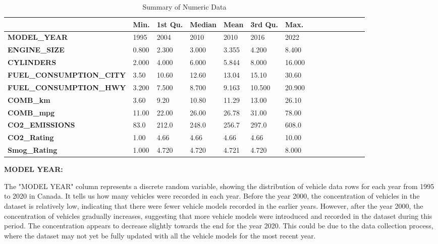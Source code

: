\documentclass[12pt, a4paper,oneside]{book}
\numberwithin{equation}{section}
\begin{document}
\begin{table}
\centering
\caption{Summary of Numeric Data}
\label{tab:numeric_summary}
\begin{tabular}{|p{5.5cm}|p{1cm}|p{1cm}|p{1.3cm}|p{1cm}|p{1cm}|p{1cm}|p{1cm}|p{1cm}|p{1cm}|p{1cm}|p{1cm}|p{1cm}|p{1cm}|p{1cm}|}
\hline
& \textbf{\small Min.} & \textbf{\small 1st Qu.} & \textbf{\small Median} & \textbf{\small Mean} & \textbf{\small 3rd Qu.} & \textbf{\small Max.} \\
\hline
\textbf{\small MODEL\_YEAR} & 1995 & 2004 & 2010 & 2010 & 2016 & 2022 \\
\hline
\textbf{\small ENGINE\_SIZE} & 0.800 & 2.300 & 3.000 & 3.355 & 4.200 & 8.400 \\
\hline
\textbf{\small CYLINDERS} & 2.000 & 4.000 & 6.000 & 5.844 & 8.000 & 16.000 \\
\hline
\textbf{\small FUEL\_CONSUMPTION\_CITY} & 3.50 & 10.60 & 12.60 & 13.04 & 15.10 & 30.60 \\
\hline
\textbf{\small FUEL\_CONSUMPTION\_HWY} & 3.200 & 7.500 & 8.700 & 9.163 & 10.500 & 20.900 \\
\hline
\textbf{\small COMB\_km} & 3.60 & 9.20 & 10.80 & 11.29 & 13.00 & 26.10 \\
\hline
\textbf{\small COMB\_mpg} & 11.00 & 22.00 & 26.00 & 26.78 & 31.00 & 78.00 \\
\hline
\textbf{\small CO2\_EMISSIONS} & 83.0 & 212.0 & 248.0 & 256.7 & 297.0 & 608.0 \\
\hline
\textbf{\small CO2\_Rating} & 1.00 & 4.66 & 4.66 & 4.66 & 4.66 & 10.00 \\
\hline
\textbf{\small Smog\_Rating} & 1.000 & 4.720 & 4.720 & 4.721 & 4.720 & 8.000 \\
\hline
\end{tabular}
\end{table}

\textbf{MODEL YEAR:}

The "MODEL YEAR" column represents a discrete random variable, showing the distribution of vehicle data rows for each year from 1995 to 2020 in Canada. It tells us how many vehicles were recorded in each year. Before the year 2000, the concentration of vehicles in the dataset is relatively low, indicating that there were fewer vehicle models recorded in the earlier years. However, after the year 2000, the concentration of vehicles gradually increases, suggesting that more vehicle models were introduced and recorded in the dataset during this period. The concentration appears to decrease slightly towards the end for the year 2020. This could be due to the data collection process, where the dataset may not yet be fully updated with all the vehicle models for the most recent year.
\end{document}
